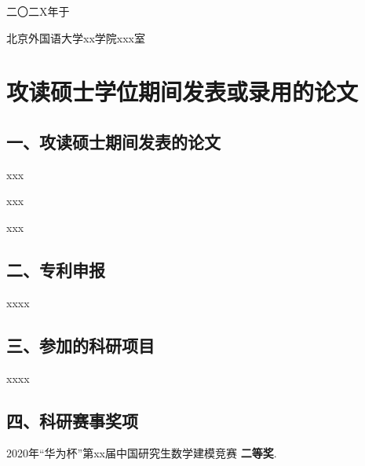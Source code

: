 \documentclass{BFSU-master-thesis}
\begin{document}
\hfill 二〇二X年于

\hfill  北京外国语大学xx学院xxx室


\chapter*{攻读硕士学位期间发表或录用的论文}


\section*{一、攻读硕士期间发表的论文}

\begin{enumerate}[label={{[}\arabic*{]}},nosep]
\item xxx
\item xxx
\item xxx
\end{enumerate}

\section*{二、专利申报}

\begin{enumerate}[label={{[}\arabic*{]}},nosep]
\item xxxx
\end{enumerate}

\section*{三、参加的科研项目}

\begin{enumerate}[label={{[}\arabic*{]}},nosep]
\item xxxx
\end{enumerate}

\section*{四、科研赛事奖项}

\begin{enumerate}[label={{[}\arabic*{]}},nosep]
\item 2020年“华为杯”第xx届中国研究生数学建模竞赛 \quad \textbf{二等奖}.
\end{enumerate}
\end{document}
